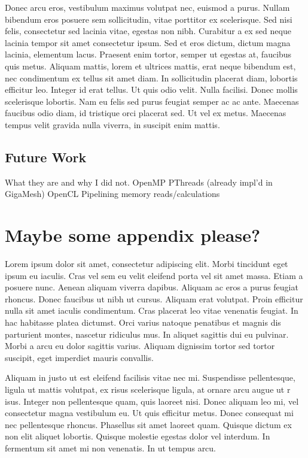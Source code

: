 \documentclass[openany]{book}
\begin{document}
Donec arcu eros, vestibulum maximus volutpat nec, euismod a purus. Nullam bibendum 
eros posuere sem sollicitudin, vitae porttitor ex scelerisque. Sed nisi felis, 
consectetur sed lacinia vitae, egestas non nibh. Curabitur a ex sed neque lacinia 
tempor sit amet consectetur ipsum. Sed et eros dictum, dictum magna lacinia, 
elementum lacus. Praesent enim tortor, semper ut egestas at, faucibus quis metus. 
Aliquam mattis, lorem et ultrices mattis, erat neque bibendum est, nec condimentum 
ex tellus sit amet diam. In sollicitudin placerat diam, lobortis efficitur leo. 
Integer id erat tellus. Ut quis odio velit. Nulla facilisi. Donec mollis 
scelerisque lobortis. Nam eu felis sed purus feugiat semper ac ac ante. Maecenas 
faucibus odio diam, id tristique orci placerat sed. Ut vel ex metus. Maecenas 
tempus velit gravida nulla viverra, in suscipit enim mattis.


\section{Future Work}
What they are and why I did not.
OpenMP
PThreads
(already impl’d in GigaMesh)
OpenCL
Pipelining memory reads/calculations




\appendix
\chapter{Maybe some appendix please?}
Lorem ipsum dolor sit amet, consectetur adipiscing elit. Morbi tincidunt eget 
ipsum eu iaculis. Cras vel sem eu velit eleifend porta vel sit amet massa. Etiam 
a posuere nunc. Aenean aliquam viverra dapibus. Aliquam ac eros a purus feugiat 
rhoncus. Donec faucibus ut nibh ut cursus. Aliquam erat volutpat. Proin efficitur 
nulla sit amet iaculis condimentum. Cras placerat leo vitae venenatis feugiat. In 
hac habitasse platea dictumst. Orci varius natoque penatibus et magnis dis 
parturient montes, nascetur ridiculus mus. In aliquet sagittis dui eu pulvinar. 
Morbi a arcu eu dolor sagittis varius. Aliquam dignissim tortor sed tortor 
suscipit, eget imperdiet mauris convallis.

Aliquam in justo ut est eleifend facilisis vitae nec mi. Suspendisse pellentesque, 
ligula ut mattis volutpat, ex risus scelerisque ligula, at ornare arcu augue ut r
isus. Integer non pellentesque quam, quis laoreet nisi. Donec aliquam leo mi, vel 
consectetur magna vestibulum eu. Ut quis efficitur metus. Donec consequat mi nec 
pellentesque rhoncus. Phasellus sit amet laoreet quam. Quisque dictum ex non elit 
aliquet lobortis. Quisque molestie egestas dolor vel interdum. In fermentum sit 
amet mi non venenatis. In ut tempus arcu.
\end{document}
